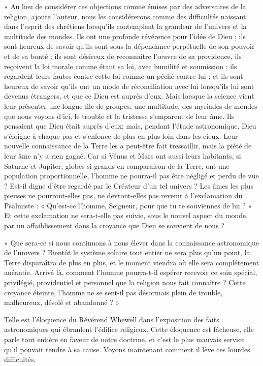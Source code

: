 \documentclass[a4paper, 11pt, oneside]{article}
\begin{document}
« Au lieu de considérer ces objections comme émises par des adversaires de la religion, ajoute l'auteur, nous les considérerons comme des difficultés naissant dans l'esprit des chrétiens lorsqu'ils contemplent la grandeur de l'univers et la multitude des mondes. Ils ont une profonde révérence pour l'idée de Dieu ; ils sont heureux de savoir qu'ils sont sous la dépendance perpétuelle de son pouvoir et de sa bonté ; ils sont désireux de reconnaître l'œuvre de sa providence, ils reçoivent la loi morale comme étant sa loi, avec humilité et soumission ; ils regardent leurs fautes contre cette loi comme un péché contre lui ; et ils sont heureux de savoir qu'ils ont un mode de réconciliation avec lui lorsqu'ils lui sont devenus étrangers, et que ce Dieu est auprès d'eux. Mais lorsque la science vient leur présenter une longue file de groupes, une multitude, des myriades de mondes que nous voyons d'ici, le trouble et la tristesse s'emparent de leur âme. Ils pensaient que Dieu était auprès d'eux; mais, pendant l'étude astronomique, Dieu s'éloigne à chaque pas et s'enfonce de plus en plus loin dans les cieux. Leur nouvelle connaissance de la Terre les a peut-être fait tressaillir, mais la piété de leur âme n'y a rien gagné. Car si Vénus et Mars ont aussi leurs habitants, si Saturne et Jupiter, globes si grands en comparaison de la Terre, ont une population proportionnelle, l'homme ne pourra-il pas être négligé et perdu de vue ? Est-il digne d'être regardé par le Créateur d'un tel univers ? Les âmes les plus pieuses ne pourront-elles pas, ne devront-elles pas revenir à l'exclamation du Psalmiste : « Qu'est-ce l'homme, Seigneur, pour que tu te souviennes de lui ? » Et cette exclamation ne sera-t-elle pas suivie, sous le nouvel aspect du monde, par un affaiblissement dans la croyance que Dieu se souvient de nous ?

« Que sera-ce si nous continuons à nous élever dans la connaissance astronomique de l'univers ? Bientôt le système solaire tout entier ne sera plus qu'un point, la Terre disparaîtra de plus en plus, et le moment viendra où elle sera complétement anéantie. Arrivé là, comment l'homme pourra-t-il espérer recevoir ce soin spécial, privilégié, providentiel et personnel que la religion nous fait connaître ? Cette croyance éteinte, l'homme ne se sent-il pas désormais plein de trouble, malheureux, désolé et abandonné ? »

Telle est l'éloquence du Révérend Whewell dans l'exposition des faits astronomiques qui ébranlent l'édifice religieux. Cette éloquence est fâcheuse, elle parle tout entière en faveur de notre doctrine, et c'est le plus mauvais service qu'il pouvait rendre à sa cause. Voyons maintenant comment il lève ces lourdes difficultés.
\end{document}
